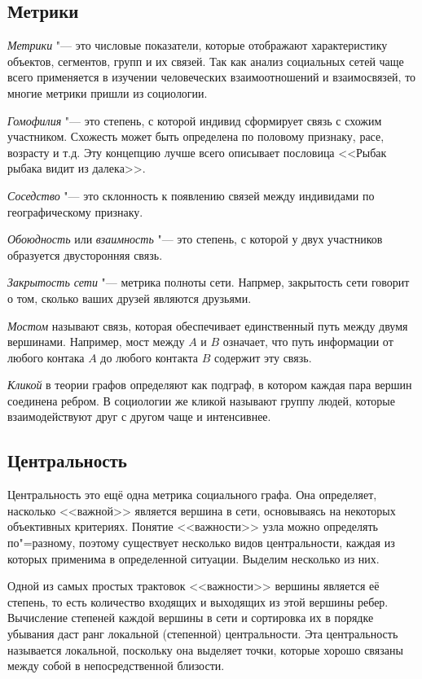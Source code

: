 \subsection{Метрики}
\textit{Метрики} "--- это числовые показатели, которые отображают характеристику объектов, сегментов, групп и их связей. Так как анализ социальных сетей чаще всего применяется в изучении человеческих взаимоотношений и взаимосвязей, то многие метрики пришли из социологии.

\textit{Гомофилия} "--- это степень, с которой индивид сформирует связь с схожим участником. Схожесть может быть определена по половому признаку, расе, возрасту и т.д. Эту концепцию лучше всего описывает пословица <<Рыбак рыбака видит из далека>>.

\textit{Соседство} "--- это склонность к появлению связей между индивидами по географическому признаку.

\textit{Обоюдность} или \textit{взаимность} "--- это степень, с которой у двух участников образуется двусторонняя связь\cite{kadushin2012understanding}.

\textit{Закрытость сети} "--- метрика полноты сети. Напрмер, закрытость сети говорит о том, сколько ваших друзей являются друзьями\cite{wong2014design}.

\textit{Мостом} называют связь, которая обеспечивает единственный путь между двумя вершинами. Например, мост между $A$ и $B$ означает, что путь информации от любого контака $A$ до любого контакта $B$ содержит эту связь\cite{Granovetter}.

\textit{Кликой} в теории графов определяют как подграф, в котором каждая пара вершин соединена ребром. В социологии же кликой называют группу людей, которые взаимодействуют друг с другом чаще и интенсивнее\cite{wong2014design}.

\subsection{Центральность}
Центральность это ещё одна метрика социального графа. Она определяет, насколько  <<важной>> является вершина в сети, основываясь на некоторых объективных критериях\cite{hansen2010analyzing}. Понятие <<важности>> узла можно определять по"=разному, поэтому существует несколько видов центральности, каждая из которых применима в определенной ситуации. Выделим несколько из них.

Одной из самых простых трактовок <<важности>> вершины является её степень, то есть количество входящих и выходящих из этой вершины ребер. Вычисление степеней каждой вершины в сети и сортировка их в порядке убывания даст ранг локальной (степенной) центральности. Эта центральность называется локальной, поскольку она выделяет точки, которые хорошо связаны между собой в непосредственной близости\cite{scott2012social}.

